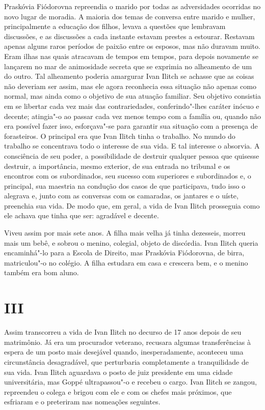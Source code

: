 Praskóvia Fiódorovna repreendia o marido por todas as adversidades
ocorridas no novo lugar de moradia. A maioria dos temas de conversa
entre marido e mulher, principalmente a educação dos filhos, levava a
questões que lembravam discussões, e as discussões a cada instante
estavam prestes a estourar. Restavam apenas alguns raros períodos de
paixão entre os esposos, mas não duravam muito. Eram ilhas nas quais
atracavam de tempos em tempos, para depois novamente se lançarem no mar
de animosidade secreta que se exprimia no alheamento de um do outro. Tal
alheamento poderia amargurar Ivan Ilitch se achasse que as coisas não
deveriam ser assim, mas ele agora reconhecia essa situação não apenas
como normal, mas ainda como o objetivo de sua atuação familiar. Seu
objetivo consistia em se libertar cada vez mais das contrariedades,
conferindo"-lhes caráter inócuo e decente; atingia"-o ao passar cada vez
menos tempo com a família ou, quando não era possível fazer isso,
esforçava"-se para garantir sua situação com a presença de forasteiros. O
principal era que Ivan Ilitch tinha o trabalho. No mundo do trabalho se
concentrava todo o interesse de sua vida. E tal interesse o absorvia. A
consciência de seu poder, a possibilidade de destruir qualquer pessoa
que quisesse destruir, a importância, mesmo exterior, de sua entrada no
tribunal e os encontros com os subordinados, seu sucesso com superiores
e subordinados e, o principal, sua maestria na condução dos casos de que
participava, tudo isso o alegrava e, junto com as conversas com os
camaradas, os jantares e o uíste, preenchia sua vida. De modo que, em
geral, a vida de Ivan Ilitch prosseguia como ele achava que tinha que
ser: agradável e decente.

Viveu assim por mais sete anos. A filha mais velha já tinha dezesseis,
morreu mais um bebê, e sobrou o menino, colegial, objeto de discórdia.
Ivan Ilitch queria encaminhá"-lo para a Escola de Direito, mas Praskóvia
Fiódorovna, de birra, matriculou"-o no colégio. A filha estudara em casa
e crescera bem, e o menino também era bom aluno.

\section*{III}

Assim transcorreu a vida de Ivan Ilitch no decurso de 17 anos depois de
seu matrimônio. Já era um procurador veterano, recusara algumas
transferências à espera de um posto mais desejável quando,
inesperadamente, aconteceu uma circunstância desagradável, que
perturbaria completamente a tranquilidade de sua vida. Ivan Ilitch
aguardava o posto de juiz presidente em uma cidade universitária, mas
Goppé ultrapassou"-o e recebeu o cargo. Ivan Ilitch se zangou, repreendeu
o colega e brigou com ele e com os chefes mais próximos, que esfriaram e
o preteriram nas nomeações seguintes.

